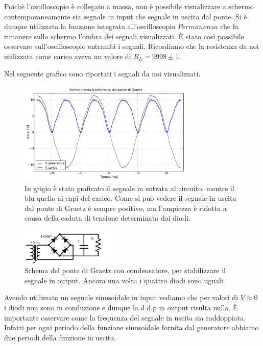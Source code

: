 Poichè l'oscilloscopio è collegato a massa, non è possibile visualizzare a schermo contemporaneamente sia segnale in input che segnale in uscita dal ponte. Si è dunque utilizzata la funzione integrata all'oscilloscopio $Permanenza$ che fa rimanere sullo schermo l'ombra dei segnali visualizzati. \`E stato così possibile osservare sull'oscilloscopio entrambi i segnali. Ricordiamo che la resistenza da noi utilizzata come carico aveva un valore di $R_L=9998 \pm 1$.

Nel seguente grafico sono riportati i segnali da noi visualizzati.

\begin{figure}[h]
\center
	\includegraphics[width=0.75\textwidth]{graetz.pdf}
	\caption{In grigio è stato graficato il segnale in entrata al circuito, mentre il blu quello ai capi del carico. Come si può vedere il segnale in uscita dal ponte di Graetz è sempre positivo, ma l'ampiezza è ridotta a causa della caduta di tensione determinata dai diodi.}
	\label{fig:graetz}
\end{figure}

\begin{figure}
	\includegraphics[width=0.4\textwidth]{schema_ripple.pdf}
	\caption{Schema del ponte di Graetz con condensatore, per stabilizzare il segnale in output. Ancora una volta i quattro diodi sono uguali.}
	\label{fig:schema_ripple}
\end{figure}

Avendo utilizzato un segnale sinusoidale in input vediamo che per valori di $V \approx 0$ i diodi non sono in conduzione e dunque la d.d.p in output risulta nulla. \`E importante osservare come la frequenza del segnale in uscita sia raddoppiata. Infatti per ogni periodo della funzione sinusoidale fornita dal generatore abbiamo due periodi della funzione in uscita.

